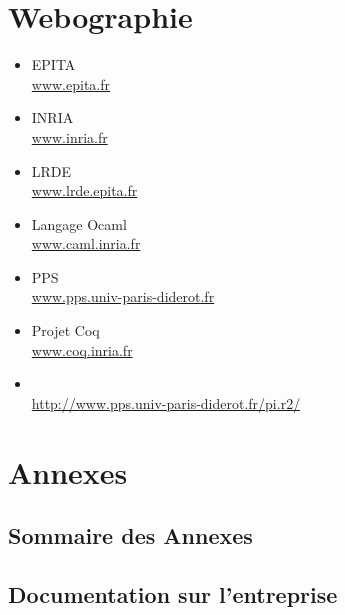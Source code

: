 \chapter{Webographie}
\begin{itemize}
\item EPITA \\
  \url{www.epita.fr}
\item INRIA \\
  \url{www.inria.fr}
\item LRDE \\
  \url{www.lrde.epita.fr}
\item Langage Ocaml \\
  \url{www.caml.inria.fr}
\item PPS \\
  \url{www.pps.univ-paris-diderot.fr}
\item Projet Coq \\
  \url{www.coq.inria.fr}
\item \pir \\
  \url{http://www.pps.univ-paris-diderot.fr/pi.r2/}
\end{itemize}

\chapter{Annexes}
  \section{Sommaire des Annexes}
  \minitoc
  \section{Documentation sur l'entreprise}
